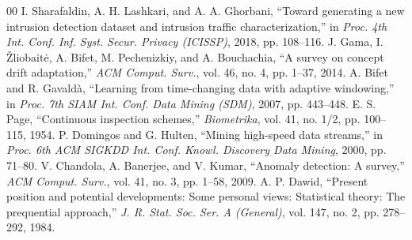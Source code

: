 \documentclass[conference]{IEEEtran}
\begin{document}
\begin{thebibliography}{00}
 I. Sharafaldin, A. H. Lashkari, and A. A. Ghorbani, ``Toward generating a new intrusion detection dataset and intrusion traffic characterization,'' in \textit{Proc. 4th Int. Conf. Inf. Syst. Secur. Privacy (ICISSP)}, 2018, pp. 108--116.
 J. Gama, I. \v{Z}liobait\.{e}, A. Bifet, M. Pechenizkiy, and A. Bouchachia, ``A survey on concept drift adaptation,'' \textit{ACM Comput. Surv.}, vol. 46, no. 4, pp. 1--37, 2014.
 A. Bifet and R. Gavald\`{a}, ``Learning from time-changing data with adaptive windowing,'' in \textit{Proc. 7th SIAM Int. Conf. Data Mining (SDM)}, 2007, pp. 443--448.
 E. S. Page, ``Continuous inspection schemes,'' \textit{Biometrika}, vol. 41, no. 1/2, pp. 100--115, 1954.
 P. Domingos and G. Hulten, ``Mining high-speed data streams,'' in \textit{Proc. 6th ACM SIGKDD Int. Conf. Knowl. Discovery Data Mining}, 2000, pp. 71--80.
 V. Chandola, A. Banerjee, and V. Kumar, ``Anomaly detection: A survey,'' \textit{ACM Comput. Surv.}, vol. 41, no. 3, pp. 1--58, 2009.
 A. P. Dawid, ``Present position and potential developments: Some personal views: Statistical theory: The prequential approach,'' \textit{J. R. Stat. Soc. Ser. A (General)}, vol. 147, no. 2, pp. 278--292, 1984.
\end{thebibliography}
\end{document}
